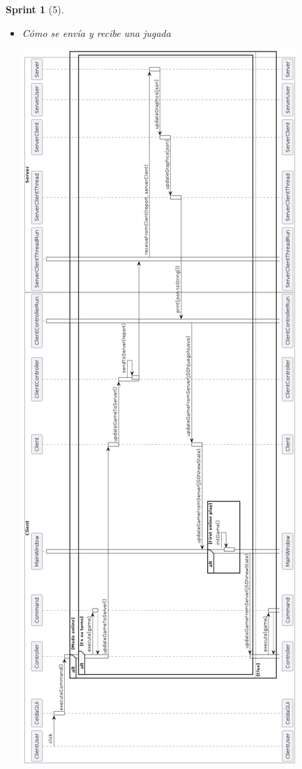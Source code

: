 \documentclass[12pt,a4paper,openright]{book}
\theoremstyle{break}
\newtheorem*{sprint}{Sprint}
\begin{document}
\begin{sprint}[5]
\begin{itemize}
\item Cómo se envía y recibe una jugada

\begin{center}
\includegraphics[scale=0.45]{juegoTipicoUml.png} 
\end{center}

\end{itemize}

\end{sprint}
\end{document}
